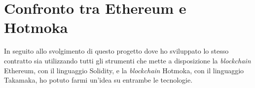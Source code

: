 
\section{Confronto tra Ethereum e Hotmoka}
In seguito allo svolgimento di questo progetto dove ho sviluppato lo stesso contratto sia utilizzando tutti gli strumenti che mette a disposizione la \textit{blockchain} Ethereum, con il linguaggio Solidity, e la \textit{blockchain} Hotmoka, con il linguaggio Takamaka, ho potuto farmi un'idea su entrambe le tecnologie.
